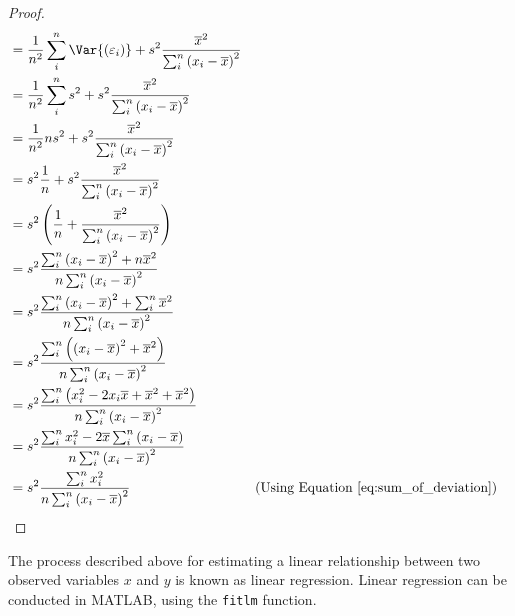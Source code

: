 \documentclass{article}
\begin{document}
\begin{proof}
\begin{align*}
                            & = \frac{1}{n^2} \sum_i^n\Var{\left( \varepsilon_i \right)} + s^2 \frac{\overline{x}^2}{\sum_i^n \left( x_i - \overline{x} \right)^2}                                                                               \\
                            & = \frac{1}{n^2} \sum_i^ns^2 + s^2 \frac{\overline{x}^2}{\sum_i^n \left( x_i - \overline{x} \right)^2}                                                                                                              \\
                            & = \frac{1}{n^2} n s^2 + s^2 \frac{\overline{x}^2}{\sum_i^n \left( x_i - \overline{x} \right)^2}                                                                                                                    \\
                            & = s^2 \frac{1}{n} + s^2 \frac{\overline{x}^2}{\sum_i^n \left( x_i - \overline{x} \right)^2}                                                                                                                        \\
                            & = s^2 \left( \frac{1}{n} + \frac{\overline{x}^2}{\sum_i^n \left( x_i - \overline{x} \right)^2} \right)                                                                                                             \\
                            & = s^2 \frac{\sum_i^n \left( x_i - \overline{x} \right)^2 + n\overline{x}^2}{n \sum_i^n \left( x_i - \overline{x} \right)^2}                                                                                        \\
                            & = s^2 \frac{\sum_i^n \left( x_i - \overline{x} \right)^2 + \sum_i^n \overline{x}^2}{n \sum_i^n \left( x_i - \overline{x} \right)^2}                                                                                \\
                            & = s^2 \frac{\sum_i^n \left( \left( x_i - \overline{x} \right)^2 + \overline{x}^2 \right)}{n \sum_i^n \left( x_i - \overline{x} \right)^2}                                                                          \\
                            & = s^2 \frac{\sum_i^n \left( x_i^2 - 2x_i\overline{x} + \overline{x}^2 + \overline{x}^2 \right)}{n \sum_i^n \left( x_i - \overline{x} \right)^2}                                                                    \\
                            & = s^2 \frac{\sum_i^n x_i^2 - 2\overline{x}\sum_i^n \left( x_i - \overline{x} \right)}{n \sum_i^n \left( x_i - \overline{x} \right)^2}                                                                              \\
                            & = s^2 \frac{\sum_i^n x_i^2}{n \sum_i^n \left( x_i - \overline{x} \right)^2}                                                                                 &  & \text{(Using Equation \ref{eq:sum_of_deviation})}
    \end{align*}
    \endgroup 
\end{proof}
The process described above for estimating a linear relationship between two observed variables $x$ and $y$ is known as linear regression.
Linear regression can be conducted in MATLAB, using the \lstinline!fitlm! function.
\end{document}
